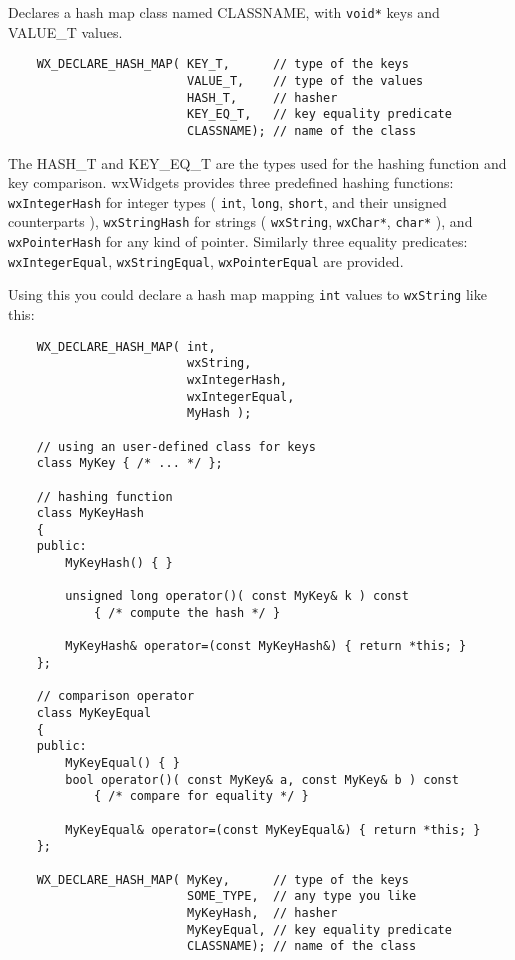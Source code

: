 Declares a hash map class named CLASSNAME, with {\tt void*} keys
and VALUE\_T values.

\begin{verbatim}
    WX_DECLARE_HASH_MAP( KEY_T,      // type of the keys
                         VALUE_T,    // type of the values
                         HASH_T,     // hasher
                         KEY_EQ_T,   // key equality predicate
                         CLASSNAME); // name of the class
\end{verbatim}

The HASH\_T and KEY\_EQ\_T are the types
used for the hashing function and key comparison. wxWidgets provides
three predefined hashing functions: {\tt wxIntegerHash}
for integer types ( {\tt int}, {\tt long}, {\tt short},
and their unsigned counterparts ), {\tt wxStringHash} for strings
( {\tt wxString}, {\tt wxChar*}, {\tt char*} ), and
{\tt wxPointerHash} for any kind of pointer.
Similarly three equality predicates:
{\tt wxIntegerEqual}, {\tt wxStringEqual}, {\tt wxPointerEqual} are provided.

Using this you could declare a hash map mapping {\tt int} values
to {\tt wxString} like this:

\begin{verbatim}
    WX_DECLARE_HASH_MAP( int,
                         wxString,
                         wxIntegerHash,
                         wxIntegerEqual,
                         MyHash );

    // using an user-defined class for keys
    class MyKey { /* ... */ };

    // hashing function
    class MyKeyHash
    {
    public:
        MyKeyHash() { }

        unsigned long operator()( const MyKey& k ) const
            { /* compute the hash */ }

        MyKeyHash& operator=(const MyKeyHash&) { return *this; }
    };

    // comparison operator
    class MyKeyEqual
    {
    public:
        MyKeyEqual() { }
        bool operator()( const MyKey& a, const MyKey& b ) const
            { /* compare for equality */ }

        MyKeyEqual& operator=(const MyKeyEqual&) { return *this; }
    };

    WX_DECLARE_HASH_MAP( MyKey,      // type of the keys
                         SOME_TYPE,  // any type you like
                         MyKeyHash,  // hasher
                         MyKeyEqual, // key equality predicate
                         CLASSNAME); // name of the class
\end{verbatim}

